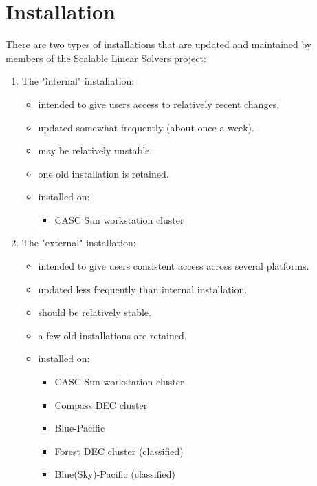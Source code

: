 \chapter{Installation}
\label{Installation}

There are two types of \hypre{} installations that are updated and
maintained by members of the Scalable Linear Solvers project:
\begin{enumerate}

\item The "internal" installation:
   \begin{itemize}
   \item intended to give users access to relatively recent changes.
   \item updated somewhat frequently (about once a week).
   \item may be relatively unstable.
   \item one old installation is retained.
   \item installed on:
      \begin{itemize}
      \item CASC Sun workstation cluster
      \end{itemize}
   \end{itemize}

\item The "external" installation:
   \begin{itemize}
   \item intended to give users consistent access across several platforms.
   \item updated less frequently than internal installation.
   \item should be relatively stable.
   \item a few old installations are retained.
   \item installed on:
      \begin{itemize}
       \item CASC Sun workstation cluster
       \item Compass DEC cluster
       \item Blue-Pacific
       \item Forest DEC cluster  (classified)
       \item Blue(Sky)-Pacific   (classified)
      \end{itemize}
   \end{itemize}

\end{enumerate}

